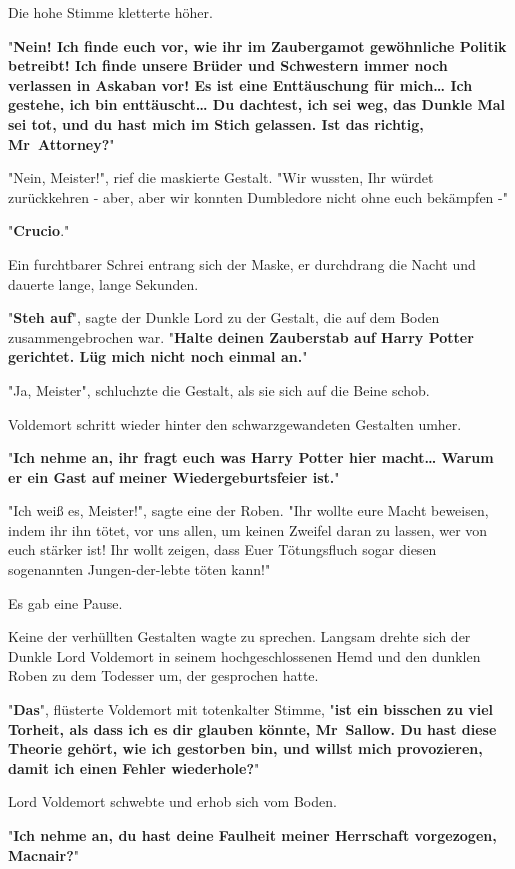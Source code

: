 {Die hohe Stimme kletterte höher.

"\textbf{Nein! Ich finde euch vor, wie ihr im Zaubergamot gewöhnliche Politik betreibt! Ich finde unsere Brüder und Schwestern immer noch verlassen in Askaban vor! Es ist eine Enttäuschung für mich… Ich gestehe, ich bin enttäuscht… Du dachtest, ich sei weg, das Dunkle Mal sei tot, und du hast mich im Stich gelassen. Ist das richtig, Mr~Attorney?}"

"Nein, Meister!", rief die maskierte Gestalt. "Wir wussten, Ihr würdet zurückkehren - aber, aber wir konnten Dumbledore nicht ohne euch bekämpfen -"

"\textbf{Crucio}."

Ein furchtbarer Schrei entrang sich der Maske, er durchdrang die Nacht und dauerte lange, lange Sekunden.

"\textbf{Steh auf}", sagte der Dunkle Lord zu der Gestalt, die auf dem Boden zusammengebrochen war. "\textbf{Halte deinen Zauberstab auf Harry Potter gerichtet. Lüg mich nicht noch einmal an.}"

"Ja, Meister", schluchzte die Gestalt, als sie sich auf die Beine schob.

Voldemort schritt wieder hinter den schwarzgewandeten Gestalten umher.

"\textbf{Ich nehme an, ihr fragt euch was Harry Potter hier macht… Warum er ein Gast auf meiner Wiedergeburtsfeier ist.}"

"Ich weiß es, Meister!", sagte eine der Roben. "Ihr wollte eure Macht beweisen, indem ihr ihn tötet, vor uns allen, um keinen Zweifel daran zu lassen, wer von euch stärker ist! Ihr wollt zeigen, dass Euer Tötungsfluch sogar diesen sogenannten Jungen-der-lebte töten kann!"

Es gab eine Pause.

Keine der verhüllten Gestalten wagte zu sprechen. Langsam drehte sich der Dunkle Lord Voldemort in seinem hochgeschlossenen Hemd und den dunklen Roben zu dem Todesser um, der gesprochen hatte.

"\textbf{Das}", flüsterte Voldemort mit totenkalter Stimme, "\textbf{ist ein bisschen zu viel Torheit, als dass ich es dir glauben könnte, Mr~Sallow. Du hast diese Theorie gehört, wie ich gestorben bin, und willst mich provozieren, damit ich einen Fehler wiederhole?}"

Lord Voldemort schwebte und erhob sich vom Boden.

"\textbf{Ich nehme an, du hast deine Faulheit meiner Herrschaft vorgezogen, Macnair?}"

}
